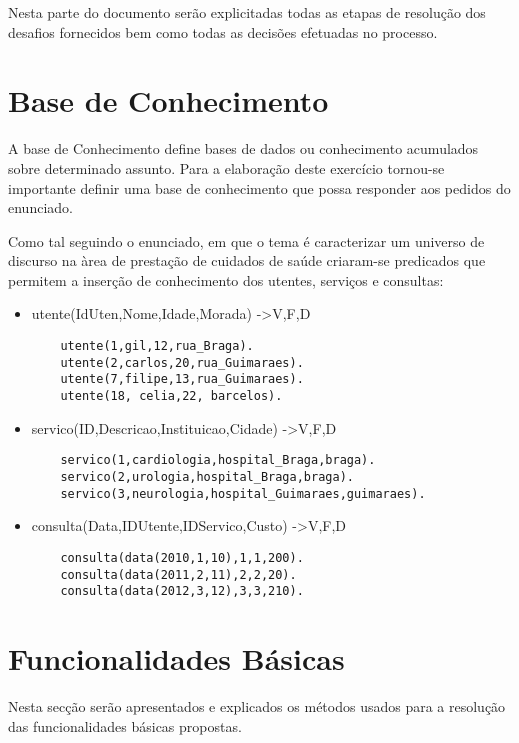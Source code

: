 Nesta parte do documento serão explicitadas todas as etapas de resolução dos desafios fornecidos bem como todas as decisões efetuadas no processo.


\section{Base de Conhecimento}
\label{p3:baseConhe}

A base de Conhecimento define bases de dados ou conhecimento acumulados sobre determinado assunto.
Para a elaboração deste exercício tornou-se importante definir uma base de conhecimento que possa responder aos pedidos do enunciado.

Como tal seguindo o enunciado, em que o tema é caracterizar um universo de discurso na àrea de prestação de cuidados de saúde criaram-se predicados que permitem a inserção de conhecimento dos utentes, serviços e consultas: 

\begin{itemize}
	\item utente(IdUten,Nome,Idade,Morada) ->{V,F,D}
	\begin{Verbatim}
	utente(1,gil,12,rua_Braga).
	utente(2,carlos,20,rua_Guimaraes).
	utente(7,filipe,13,rua_Guimaraes).
	utente(18, celia,22, barcelos). 
	\end{Verbatim}
	
	\item servico(ID,Descricao,Instituicao,Cidade) ->{V,F,D}
	
	\begin{Verbatim}
	servico(1,cardiologia,hospital_Braga,braga).
	servico(2,urologia,hospital_Braga,braga).
	servico(3,neurologia,hospital_Guimaraes,guimaraes). 

	\end{Verbatim}
	
	\item consulta(Data,IDUtente,IDServico,Custo) ->{V,F,D}
	
	\begin{Verbatim}
	consulta(data(2010,1,10),1,1,200).
	consulta(data(2011,2,11),2,2,20).
	consulta(data(2012,3,12),3,3,210).
	\end{Verbatim}
\end{itemize}

\section{Funcionalidades Básicas}
\label{p3:funcbasic}
Nesta secção serão apresentados e explicados os métodos usados para a resolução das funcionalidades básicas propostas.

